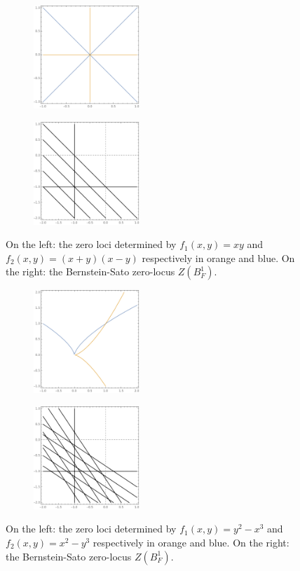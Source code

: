     \begin{figure}
      \centering
      \begin{subfigure}{0.45\textwidth}
        \centering
        \includegraphics[width  = 4cm]{Figures/Hyperplane}
      \end{subfigure}
      \begin{subfigure}{0.45\textwidth}
        \centering
          \includegraphics[width = 4cm]{Figures/HyperplaneBS}
      \end{subfigure}
      \caption{On the left: the zero loci determined by $f_1(x,y) = xy$ and $f_2(x,y) = (x+y)(x-y)$ respectively in orange and blue.
      On the right: the
      Bernstein-Sato zero-locus $Z(B_F^1)$.}
      \label{figure: TwoCones}
    \end{figure}
    \begin{figure}
      \centering
      \begin{subfigure}{0.45\textwidth}
        \centering
        \includegraphics[width  = 4cm]{Figures/KissingCusps}
      \end{subfigure}
      \begin{subfigure}{0.45\textwidth}
        \centering
          \includegraphics[width = 4cm]{Figures/2CuspsBS}
      \end{subfigure}
      \caption{On the left: the zero loci determined by $f_1(x,y) = y^2 -x^3$ and $f_2(x,y) = x^2 -y^3$ respectively in orange and blue.
      On the right: the
      Bernstein-Sato zero-locus $Z(B_F^1)$.}
      \label{figure: TwoCusps}
    \end{figure}


